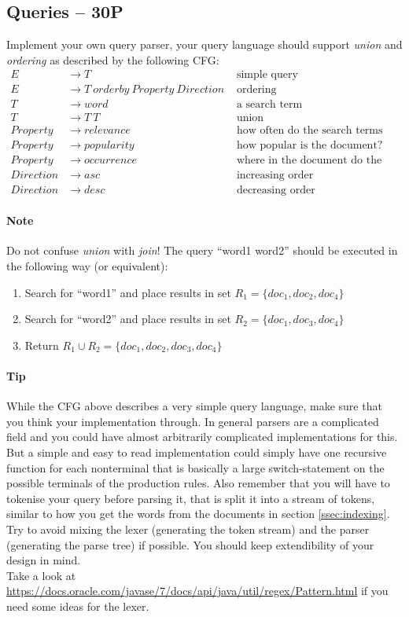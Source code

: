 \documentclass[11pt]{article}
\begin{document}
\subsection{Queries -- 30P} 
\label{sec:queries}
Implement your own query parser, your query language should support \emph{union} and \emph{ordering} as described by the following CFG:
\begin{align*}
E &\to T &\mbox{ simple query}\\
E &\to T \ orderby \ Property \ Direction &\mbox{ ordering}\\
T &\to word &\mbox{ a search term} \\
T &\to T \ T &\mbox{ union} \\
Property &\to relevance &\mbox{ how often do the search terms appear in a document?}\\
Property &\to popularity &\mbox{ how popular is the document?}\\
Property &\to occurrence &\mbox{ where in the document do the search terms appear?}\\
Direction &\to asc &\mbox{ increasing order}\\
Direction &\to desc &\mbox{ decreasing order}
\end{align*}

\paragraph{Note} Do not confuse \emph{union} with \emph{join}! The query ``word1 word2'' should be executed in the following way (or equivalent):
\begin{enumerate}[1)]
\item Search for ``word1'' and place results in set $R_1=\{doc_1, doc_2, doc_4\}$
\item Search for ``word2'' and place results in set $R_2=\{doc_1, doc_3, doc_4\}$
\item Return $R_1\cup R_2 = \{doc_1, doc_2, doc_3, doc_4\}$
\end{enumerate}

\paragraph{Tip} While the CFG above describes a very simple query language, make sure that you think your implementation through. In general parsers are a complicated field and you could have almost arbitrarily complicated implementations for this. But a simple and easy to read implementation could simply have one recursive function for each nonterminal that is basically a large switch-statement on the possible terminals of the production rules. Also remember that you will have to tokenise your query before parsing it, that is split it into a stream of tokens, similar to how you get the words from the documents in section \ref{ssec:indexing}. Try to avoid mixing the lexer (generating the token stream) and the parser (generating the parse tree) if possible. You should keep extendibility of your design in mind.\\
Take a look at \url{https://docs.oracle.com/javase/7/docs/api/java/util/regex/Pattern.html} if you need some ideas for the lexer.
\end{document}
